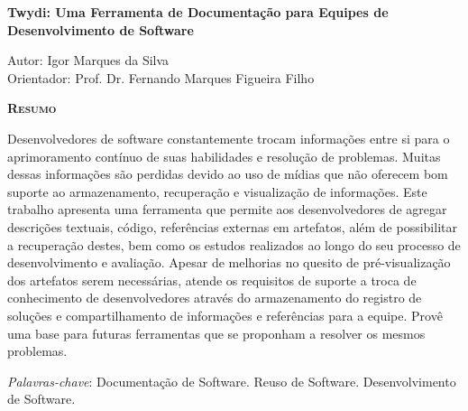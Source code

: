 \begin{center}
	{\Large{\textbf{Twydi: Uma Ferramenta de Documentação para Equipes de Desenvolvimento de Software}}}
\end{center}

\vspace{1cm}

\begin{flushright}
	Autor: Igor Marques da Silva\\
	Orientador: Prof. Dr. Fernando Marques Figueira Filho
\end{flushright}

\vspace{1cm}

\begin{center}
	\Large{\textsc{\textbf{Resumo}}}
\end{center}

\noindent Desenvolvedores de software constantemente trocam informações entre si para o aprimoramento contínuo de suas habilidades e resolução de problemas. Muitas dessas informações são perdidas devido ao uso de mídias que não oferecem bom suporte ao armazenamento, recuperação e visualização de informações.
Este trabalho apresenta uma ferramenta que permite aos desenvolvedores de agregar descrições textuais, código, referências externas em artefatos, além de possibilitar a recuperação destes, bem como os estudos realizados ao longo do seu processo de desenvolvimento e avaliação. Apesar de melhorias no quesito de pré-visualização dos artefatos serem necessárias, atende os requisitos de suporte a troca de conhecimento de desenvolvedores através do armazenamento do registro de soluções e compartilhamento de informações e referências para a equipe. Provê uma base para futuras ferramentas que se proponham a resolver os mesmos problemas.

\noindent\textit{Palavras-chave}: Documentação de Software. Reuso de Software. Desenvolvimento de Software.
